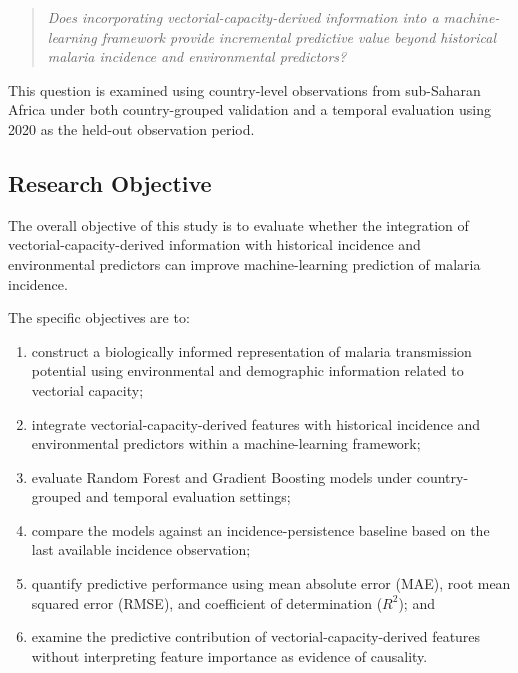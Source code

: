 \documentclass[10pt,twocolumn]{article}
\begin{document}
\begin{quote}
\textit{Does incorporating vectorial-capacity-derived information into
a machine-learning framework provide incremental predictive value
beyond historical malaria incidence and environmental predictors?}
\end{quote}

This question is examined using country-level observations from
sub-Saharan Africa under both country-grouped validation and a
temporal evaluation using 2020 as the held-out observation period.


\subsection{Research Objective}

The overall objective of this study is to evaluate whether the
integration of vectorial-capacity-derived information with historical
incidence and environmental predictors can improve machine-learning
prediction of malaria incidence.

The specific objectives are to:

\begin{enumerate}
    \item construct a biologically informed representation of malaria
    transmission potential using environmental and demographic
    information related to vectorial capacity;

    \item integrate vectorial-capacity-derived features with historical
    incidence and environmental predictors within a machine-learning
    framework;

    \item evaluate Random Forest and Gradient Boosting models under
    country-grouped and temporal evaluation settings;

    \item compare the models against an incidence-persistence baseline
    based on the last available incidence observation;

    \item quantify predictive performance using mean absolute error
    (MAE), root mean squared error (RMSE), and coefficient of
    determination ($R^2$); and

    \item examine the predictive contribution of vectorial-capacity-derived
    features without interpreting feature importance as evidence of
    causality.
\end{enumerate}
\end{document}
